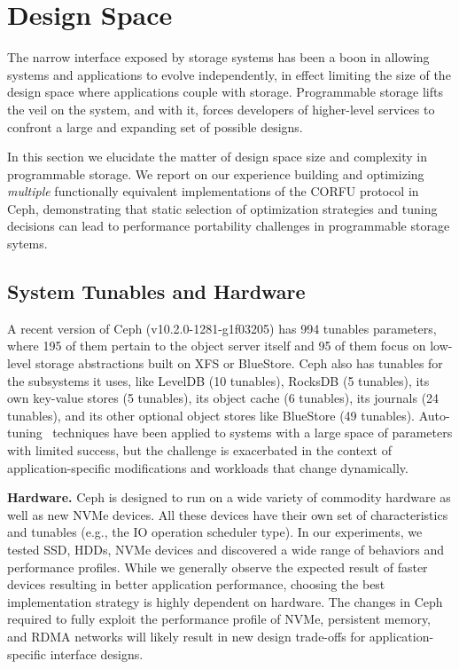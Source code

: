 \section{Design Space}
\label{sec:dspace}

The narrow interface exposed by storage systems has been a boon in allowing
systems and applications to evolve independently, in effect limiting the size
of the design space where applications couple with storage. Programmable
storage lifts the veil on the system, and with it, forces developers of higher-level services
to confront a large and expanding set of possible designs.

In this section we elucidate the matter of design space size and complexity in
programmable storage. We report on our experience building and optimizing
\emph{multiple} functionally equivalent implementations of the CORFU protocol
in Ceph, demonstrating that static selection of optimization strategies and tuning
decisions can lead to performance portability challenges in programmable
storage sytems.

\subsection{System Tunables and Hardware}

A recent version of Ceph (v10.2.0-1281-g1f03205) has 994 tunables parameters,
where 195 of them pertain to the object server itself and 95 of them focus on
low-level storage abstractions built on XFS or BlueStore.  Ceph also has
tunables for the subsystems it uses, like LevelDB (10 tunables), RocksDB (5
tunables), its own key-value stores (5 tunables), its object cache (6
tunables), its journals (24 tunables), and its other optional object stores
like BlueStore (49 tunables).  Auto-tuning~\cite{behzad:sc2013-autotuning}
techniques have been applied to systems with a large space of parameters with
limited success, but the challenge is exacerbated in the context of
application-specific modifications and workloads that change dynamically.

{\bf Hardware.} Ceph is designed to run on a wide variety of commodity
hardware as well as new NVMe devices. All these devices have their own set of
characteristics and tunables (e.g., the IO operation scheduler type). In our
experiments, we tested SSD, HDDs, NVMe devices and discovered a wide range of
behaviors and performance profiles. While we generally observe the expected
result of faster devices resulting in better application performance, choosing
the best implementation strategy is highly dependent on hardware. The changes
in Ceph required to fully exploit the performance profile of NVMe, persistent
memory, and RDMA networks will likely result in new design trade-offs for
application-specific interface designs.

